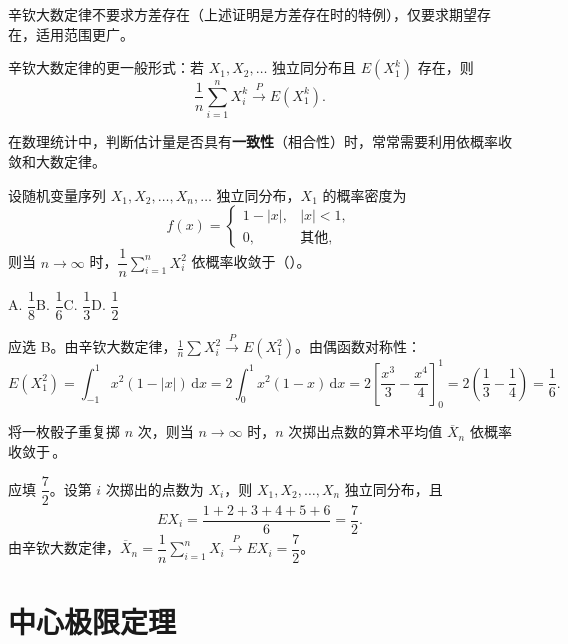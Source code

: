 \documentclass[lang=cn,11pt]{elegantbook}
\begin{document}
\begin{note}
辛钦大数定律不要求方差存在（上述证明是方差存在时的特例），仅要求期望存在，适用范围更广。

辛钦大数定律的更一般形式：若 \(X_1, X_2, \dots\) 独立同分布且 \(E(X_1^k)\) 存在，则
\[
\frac{1}{n}\sum_{i=1}^{n} X_i^k \stackrel{P}{\longrightarrow} E(X_1^k).
\]

在数理统计中，判断估计量是否具有\textbf{一致性}（相合性）时，常常需要利用依概率收敛和大数定律。
\end{note}

\begin{exercise}\label{exer:5-khinchin-x2}
设随机变量序列 \(X_1, X_2, \dots, X_n, \dots\) 独立同分布，\(X_1\) 的概率密度为
\[
f(x) = \begin{cases} 1 - |x|, & |x| < 1, \\ 0, & \text{其他}, \end{cases}
\]
则当 \(n \to \infty\) 时，\(\dfrac{1}{n}\displaystyle\sum_{i=1}^{n} X_i^2\) 依概率收敛于（\quad）。\par
A. \(\dfrac{1}{8}\)\quad B. \(\dfrac{1}{6}\)\quad C. \(\dfrac{1}{3}\)\quad D. \(\dfrac{1}{2}\)
\end{exercise}
\begin{solution}
应选 B。由辛钦大数定律，\(\frac{1}{n}\sum X_i^2 \stackrel{P}{\longrightarrow} E(X_1^2)\)。由偶函数对称性：
\[
E(X_1^2) = \int_{-1}^{1} x^2(1-|x|)\,\mathrm{d}x = 2\int_0^1 x^2(1-x)\,\mathrm{d}x
= 2\!\left[\frac{x^3}{3} - \frac{x^4}{4}\right]_0^1 = 2\!\left(\frac{1}{3}-\frac{1}{4}\right) = \frac{1}{6}.
\]
\end{solution}

\begin{exercise}\label{exer:5-lln-dice}
将一枚骰子重复掷 \(n\) 次，则当 \(n \to \infty\) 时，\(n\) 次掷出点数的算术平均值 \(\overline{X}_n\) 依概率收敛于\,\underline{\hspace{2cm}}。
\end{exercise}
\begin{solution}
应填 \(\dfrac{7}{2}\)。设第 \(i\) 次掷出的点数为 \(X_i\)，则 \(X_1, X_2, \dots, X_n\) 独立同分布，且
\[
EX_i = \frac{1 + 2 + 3 + 4 + 5 + 6}{6} = \frac{7}{2}.
\]
由辛钦大数定律，\(\overline{X}_n = \dfrac{1}{n}\displaystyle\sum_{i=1}^{n} X_i \stackrel{P}{\longrightarrow} EX_i = \dfrac{7}{2}\)。
\end{solution}



\section{中心极限定理}
\end{document}
